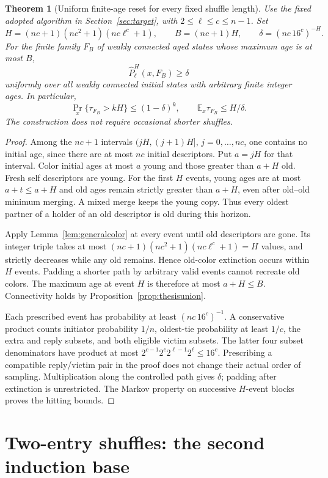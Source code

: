 \documentclass[11pt]{article}
\newtheorem{theorem}{Theorem}
\begin{document}
\begin{theorem}[Uniform finite-age reset for every fixed shuffle length]
\label{thm:thesisgeneralreset}
Use the fixed adopted algorithm in Section~\ref{sec:target},
with $2\le\ell\le c\le n-1$. Set
\[
 H=(nc+1)(nc^2+1)(nc\ell^c+1),\qquad
 B=(nc+1)H,\qquad
 \delta=(nc\,16^c)^{-H}.
\]
For the finite family $F_B$ of weakly connected aged states
whose maximum age is at most $B$,
\[
 \widehat P_\ell^H(x,F_B)\ge\delta
\]
uniformly over all weakly connected initial states with
arbitrary finite integer ages. In particular,
\[
 \Pr_x\{\tau_{F_B}>kH\}\le(1-\delta)^k,\qquad
 \mathbb E_x\tau_{F_B}\le H/\delta.
\]
The construction does not require occasional shorter shuffles.
\end{theorem}
\begin{proof}
Among the $nc+1$ intervals $(jH,(j+1)H]$, $j=0,\ldots,nc$,
one contains no initial age, since there are at most $nc$
initial descriptors. Put $a=jH$ for that interval.
Color initial ages at most $a$ young and those greater
than $a+H$ old. Fresh self descriptors are young.
For the first $H$ events, young ages are at most $a+t\le a+H$
and old ages remain strictly greater than $a+H$, even after
old--old minimum merging. A mixed merge keeps the young copy.
Thus every oldest partner of a holder of an old descriptor
is old during this horizon.

Apply Lemma~\ref{lem:generalcolor} at every event until
old descriptors are gone. Its integer triple takes at most
$(nc+1)(nc^2+1)(nc\ell^c+1)=H$ values, and strictly decreases
while any old remains. Hence old-color extinction occurs
within $H$ events. Padding a shorter path by arbitrary
valid events cannot recreate old colors. The maximum age
at event $H$ is therefore at most $a+H\le B$.
Connectivity holds by Proposition~\ref{prop:thesisunion}.

Each prescribed event has probability at least
$(nc\,16^c)^{-1}$. A conservative product counts initiator
probability $1/n$, oldest-tie probability at least $1/c$,
the extra and reply subsets, and both eligible victim subsets.
The latter four subset denominators have product at most
$2^{c-1}2^c2^{\ell-1}2^\ell\le16^c$.
Prescribing a compatible reply/victim pair in the proof
does not change their actual order of sampling.
Multiplication along the controlled path gives $\delta$;
padding after extinction is unrestricted.
The Markov property on successive $H$-event blocks proves
the hitting bounds.
\end{proof}

\section{Two-entry shuffles: the second induction base}
\end{document}
